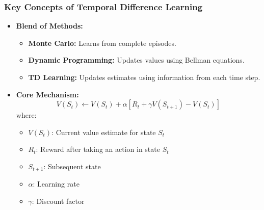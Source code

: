 \documentclass[aspectratio=169]{beamer}
\begin{document}
\begin{frame}[fragile]
    \frametitle{Key Concepts of Temporal Difference Learning}
    \begin{itemize}
        \item \textbf{Blend of Methods:}
        \begin{itemize}
            \item \textbf{Monte Carlo:} Learns from complete episodes.
            \item \textbf{Dynamic Programming:} Updates values using Bellman equations.
            \item \textbf{TD Learning:} Updates estimates using information from each time step.
        \end{itemize}
        
        \item \textbf{Core Mechanism:} 
            \begin{equation}
            V(S_t) \leftarrow V(S_t) + \alpha \left[ R_t + \gamma V(S_{t+1}) - V(S_t) \right]
            \end{equation}
            where:
            \begin{itemize}
                \item $V(S_t)$: Current value estimate for state $S_t$
                \item $R_t$: Reward after taking an action in state $S_t$
                \item $S_{t+1}$: Subsequent state
                \item $\alpha$: Learning rate
                \item $\gamma$: Discount factor
            \end{itemize}
    \end{itemize}
\end{frame}
\end{document}
